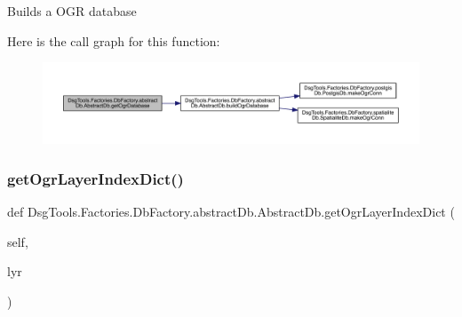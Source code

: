 \begin{DoxyVerb}Builds a OGR database
\end{DoxyVerb}
 Here is the call graph for this function\+:
\nopagebreak
\begin{figure}[H]
\begin{center}
\leavevmode
\includegraphics[width=350pt]{class_dsg_tools_1_1_factories_1_1_db_factory_1_1abstract_db_1_1_abstract_db_a7cd3ddea6686c59a6369b16b8f40794a_cgraph}
\end{center}
\end{figure}
\mbox{\label{class_dsg_tools_1_1_factories_1_1_db_factory_1_1abstract_db_1_1_abstract_db_a3c0fb949623a1edca9ee934c1643b157}} 
\subsubsection{\texorpdfstring{get\+Ogr\+Layer\+Index\+Dict()}{getOgrLayerIndexDict()}}
{\footnotesize\ttfamily def Dsg\+Tools.\+Factories.\+Db\+Factory.\+abstract\+Db.\+Abstract\+Db.\+get\+Ogr\+Layer\+Index\+Dict (\begin{DoxyParamCaption}\item[{}]{self,  }\item[{}]{lyr }\end{DoxyParamCaption})}

